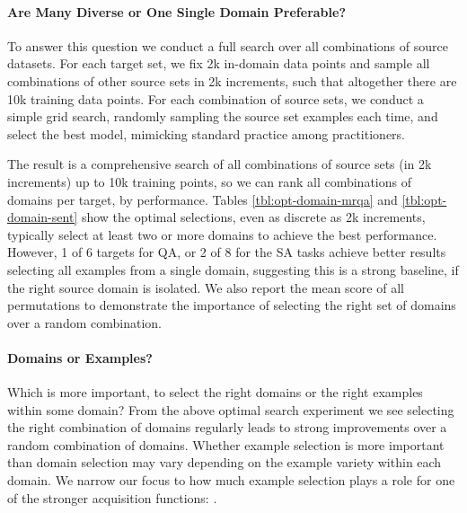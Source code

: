     \respace
    \paragraph{Are Many Diverse or One Single Domain Preferable?}
    To answer this question we conduct a full search over all combinations of source datasets.
    For each target set, we fix 2k in-domain data points and sample all combinations of other source sets in 2k increments, such that altogether there are 10k training data points.
    For each combination of source sets, we conduct a simple grid search, randomly sampling the source set examples each time, and select the best model, mimicking standard practice among practitioners.
    
    The result is a comprehensive search of all combinations of source sets (in 2k increments) up to 10k training points, so we can rank all combinations of domains per target, by performance.
    Tables \ref{tbl:opt-domain-mrqa} and \ref{tbl:opt-domain-sent} show the optimal selections, even as discrete as 2k increments, typically select at least two or more domains to achieve the best performance.
    However, 1 of 6 targets for QA, or 2 of 8 for the SA tasks achieve better results selecting all examples from a single domain, suggesting this is a strong baseline, if the right source domain is isolated.
    We also report the mean score of all permutations to demonstrate the importance of selecting the right set of domains over a random combination.
    
    
    
    \respace
    \paragraph{Domains or Examples?}
    Which is more important, to select the right domains or the right examples within some domain?
    From the above optimal search experiment we see selecting the right combination of domains regularly leads to strong improvements over a random combination of domains.
    Whether example selection is more important than domain selection may vary depending on the example variety within each domain.
    We narrow our focus to how much example selection plays a role for one of the stronger acquisition functions: \dales{}.
    
